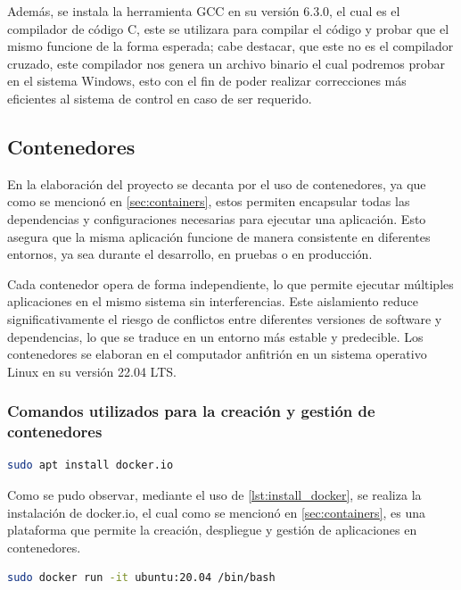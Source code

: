 Además, se instala la herramienta GCC en su versión 6.3.0, el cual es el compilador de código C, este se utilizara para compilar el código y probar que el mismo funcione de la forma esperada; cabe destacar, que este no es el compilador cruzado, este compilador nos genera un archivo binario el cual podremos probar en el sistema Windows, esto con el fin de poder realizar correcciones más eficientes al sistema de control en caso de ser requerido.

\subsection{Contenedores}\label{sec:entorno_en_contenedores}

En la elaboración del proyecto se decanta por el uso de contenedores, ya que como se mencionó en \ref{sec:containers}, estos permiten encapsular todas las dependencias y configuraciones necesarias para ejecutar una aplicación. Esto asegura que la misma aplicación funcione de manera consistente en diferentes entornos, ya sea durante el desarrollo, en pruebas o en producción. 

Cada contenedor opera de forma independiente, lo que permite ejecutar múltiples aplicaciones en el mismo sistema sin interferencias. Este aislamiento reduce significativamente el riesgo de conflictos entre diferentes versiones de software y dependencias, lo que se traduce en un entorno más estable y predecible. Los contenedores se elaboran en el computador anfitrión en un sistema operativo Linux en su versión 22.04 LTS.

\subsubsection{Comandos utilizados para la creación y gestión de contenedores}\label{subsec:manejo_de_contenedores}


\begin{lstlisting}[language=bash, caption={Instalacion de docker, Linux}, label=lst:install_docker]
    sudo apt install docker.io
\end{lstlisting}

Como se pudo observar, mediante el uso de \ref{lst:install_docker}, se realiza la instalación de docker.io, el cual como se mencionó en \ref{sec:containers}, es una plataforma que permite la creación, despliegue y gestión de aplicaciones en contenedores. 

\begin{lstlisting}[language=bash, caption={Instalacion de Ubuntu 20.04, Linux}, label=lst:install_20_04_ubuntu]
    sudo docker run -it ubuntu:20.04 /bin/bash
\end{lstlisting}

